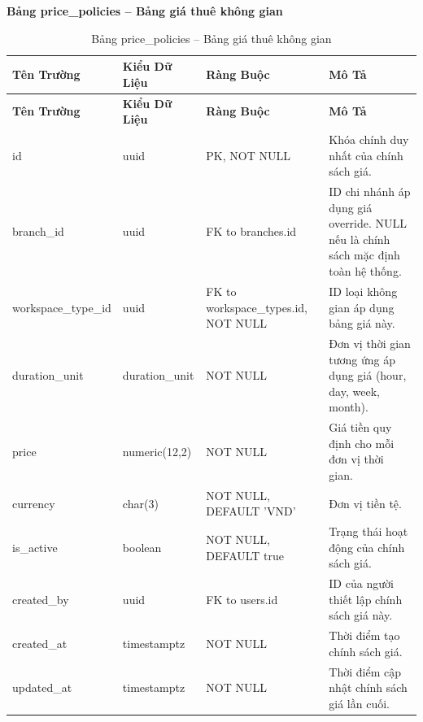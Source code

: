 \textbf{Bảng price\_\allowbreak policies -- Bảng giá thuê không gian}
\label{table:price_policies}
\begin{longtable}{|p{3cm}|p{2.5cm}|p{3.5cm}|p{5cm}|}
\caption{Bảng price\_\allowbreak policies -- Bảng giá thuê không gian} \\
\hline
\textbf{Tên Trường} & \textbf{Kiểu Dữ Liệu} & \textbf{Ràng Buộc} & \textbf{Mô Tả} \\
\hline
\endfirsthead
\hline
\textbf{Tên Trường} & \textbf{Kiểu Dữ Liệu} & \textbf{Ràng Buộc} & \textbf{Mô Tả} \\
\hline
\endhead
id & uuid & PK, NOT NULL & Khóa chính duy nhất của chính sách giá. \\
\hline
branch\_id & uuid & FK to branches.id & ID chi nhánh áp dụng giá override. NULL nếu là chính sách mặc định toàn hệ thống. \\
\hline
workspace\_type\_id & uuid & FK to workspace\_\allowbreak types.id, NOT NULL & ID loại không gian áp dụng bảng giá này. \\
\hline
duration\_unit & duration\_unit & NOT NULL & Đơn vị thời gian tương ứng áp dụng giá (hour, day, week, month). \\
\hline
price & numeric(12,2) & NOT NULL & Giá tiền quy định cho mỗi đơn vị thời gian. \\
\hline
currency & char(3) & NOT NULL, DEFAULT 'VND' & Đơn vị tiền tệ. \\
\hline
is\_active & boolean & NOT NULL, DEFAULT true & Trạng thái hoạt động của chính sách giá. \\
\hline
created\_by & uuid & FK to users.id & ID của người thiết lập chính sách giá này. \\
\hline
created\_at & timestamptz & NOT NULL & Thời điểm tạo chính sách giá. \\
\hline
updated\_at & timestamptz & NOT NULL & Thời điểm cập nhật chính sách giá lần cuối. \\
\end{longtable}

